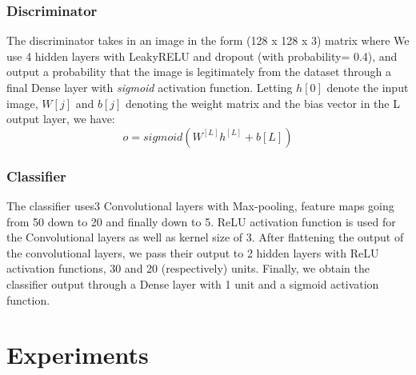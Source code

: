 \documentclass[conference]{IEEEtran}
\begin{document}
\subsubsection{Discriminator}%
The discriminator takes in an image in the form (128 x 128 x 3) matrix where We use 4 hidden layers with LeakyRELU
and dropout (with probability= 0.4), and output a probability that the image is legitimately from the dataset through a final Dense layer with \textit{sigmoid} activation function. Letting \begin{math}h[0]\end{math} denote the input
image, \begin{math}W [j]\end{math} and \begin{math}b[j]\end{math} denoting the weight matrix and the bias vector in the L output layer, we have:
\begin{equation}
o = sigmoid(W^{[L]}h^{[L]}+b{[L]})
\end{equation}


\subsubsection{Classifier}%
The classifier uses3 Convolutional layers with Max-pooling, feature maps going from 50 down to 20 and finally down to 5. ReLU activation function is used for the Convolutional layers as well as kernel size of 3. After flattening the output of the convolutional layers, we pass their output to 2 hidden layers with ReLU activation functions, 30 and 20 (respectively) units. Finally, we obtain the classifier output through a Dense layer with 1 unit and a sigmoid activation function.

\section{Experiments}
\end{document}
